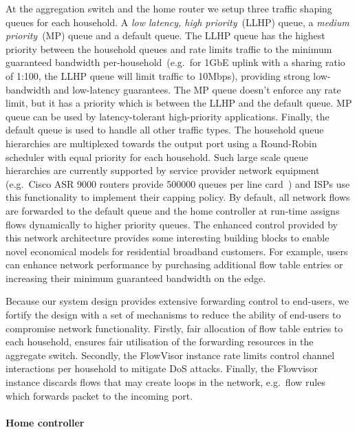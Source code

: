 At the aggregation switch and the home router we setup three traffic shaping
queues for each household. A \textit{low latency, high priority}~(LLHP) queue, a
\textit{medium priority}~(MP) queue and a default queue.  The LLHP queue has the
highest priority between the household queues and rate limits traffic to the
minimum guaranteed bandwidth per-household~(e.g.~for 1GbE uplink with a sharing
ratio of 1:100, the LLHP queue will limit traffic to 10Mbps), providing strong
low-bandwidth and low-latency guarantees. The MP queue doesn't enforce any rate
limit, but it has a priority which is between the LLHP and the default queue.
MP queue can be used by latency-tolerant high-priority applications.  Finally,
the default queue is used to handle all other traffic types.  The household
queue hierarchies are multiplexed towards the output port using a Round-Robin
scheduler with equal priority for each household. Such large scale queue
hierarchies are currently supported by service provider network equipment
(e.g.~Cisco ASR 9000 routers provide 500000 queues per line
card~) and ISPs use this functionality to implement their
capping policy. By default, all network flows are forwarded to the default queue
and the home \of controller at run-time assigns flows dynamically to higher
priority queues.  The enhanced control provided by this network architecture
provides some interesting building blocks to enable novel economical models for
residential broadband customers. For example, users can enhance network
performance by purchasing additional flow table entries or increasing their
minimum guaranteed bandwidth on the edge.

Because our system design provides extensive forwarding control to end-users, we
fortify the design with a set of mechanisms to reduce the ability of end-users
to compromise network functionality.  Firstly, fair allocation of flow table
entries to each household, ensures fair utilisation of the forwarding resources
in the aggregate switch. Secondly, the FlowVisor instance rate limits \of
control channel interactions per household to mitigate DoS attacks. Finally, the
Flowvisor instance discards flows that may create loops in the network,
e.g.~flow rules which forwards packet to the incoming port. 

\paragraph*{Home \of controller}

